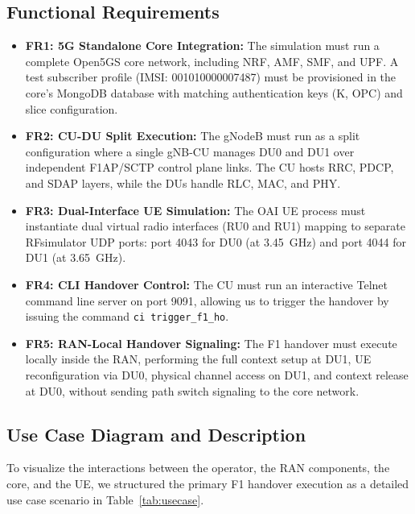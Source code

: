 \subsection{Functional Requirements}
\begin{itemize}[leftmargin=*]
    \item \textbf{FR1: 5G Standalone Core Integration:} The simulation must run a complete Open5GS core network, including NRF, AMF, SMF, and UPF. A test subscriber profile (IMSI: 001010000007487) must be provisioned in the core's MongoDB database with matching authentication keys (K, OPC) and slice configuration.
    
    \item \textbf{FR2: CU-DU Split Execution:} The gNodeB must run as a split configuration where a single gNB-CU manages DU0 and DU1 over independent F1AP/SCTP control plane links. The CU hosts RRC, PDCP, and SDAP layers, while the DUs handle RLC, MAC, and PHY.
    
    \item \textbf{FR3: Dual-Interface UE Simulation:} The OAI UE process must instantiate dual virtual radio interfaces (RU0 and RU1) mapping to separate RFsimulator UDP ports: port 4043 for DU0 (at 3.45~GHz) and port 4044 for DU1 (at 3.65~GHz).
    
    \item \textbf{FR4: CLI Handover Control:} The CU must run an interactive Telnet command line server on port 9091, allowing us to trigger the handover by issuing the command \texttt{ci trigger\_f1\_ho}.
    
    \item \textbf{FR5: RAN-Local Handover Signaling:} The F1 handover must execute locally inside the RAN, performing the full context setup at DU1, UE reconfiguration via DU0, physical channel access on DU1, and context release at DU0, without sending path switch signaling to the core network.
\end{itemize}

\subsection{Use Case Diagram and Description}
\justify
To visualize the interactions between the operator, the RAN components, the core, and the UE, we structured the primary F1 handover execution as a detailed use case scenario in Table~\ref{tab:usecase}.

